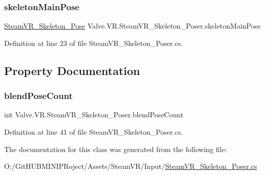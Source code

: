 \subsubsection{\texorpdfstring{skeletonMainPose}{skeletonMainPose}}
{\footnotesize\ttfamily \mbox{\hyperlink{class_valve_1_1_v_r_1_1_steam_v_r___skeleton___pose}{Steam\+V\+R\+\_\+\+Skeleton\+\_\+\+Pose}} Valve.\+V\+R.\+Steam\+V\+R\+\_\+\+Skeleton\+\_\+\+Poser.\+skeleton\+Main\+Pose}



Definition at line 23 of file Steam\+V\+R\+\_\+\+Skeleton\+\_\+\+Poser.\+cs.



\subsection{Property Documentation}
\mbox{\label{class_valve_1_1_v_r_1_1_steam_v_r___skeleton___poser_a5d7fc3c60a7e5204c951779ca781c39e}} 
\subsubsection{\texorpdfstring{blendPoseCount}{blendPoseCount}}
{\footnotesize\ttfamily int Valve.\+V\+R.\+Steam\+V\+R\+\_\+\+Skeleton\+\_\+\+Poser.\+blend\+Pose\+Count\hspace{0.3cm}{\ttfamily [get]}}



Definition at line 41 of file Steam\+V\+R\+\_\+\+Skeleton\+\_\+\+Poser.\+cs.



The documentation for this class was generated from the following file\+:\begin{DoxyCompactItemize}
\item 
O\+:/\+Git\+H\+U\+B\+M\+I\+N\+I\+P\+Roject/\+Assets/\+Steam\+V\+R/\+Input/\mbox{\hyperlink{_steam_v_r___skeleton___poser_8cs}{Steam\+V\+R\+\_\+\+Skeleton\+\_\+\+Poser.\+cs}}\end{DoxyCompactItemize}
